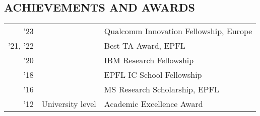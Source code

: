 \documentclass[margin, 10pt]{res} %
\begin{document}
\begin{resume}
\section{ACHIEVEMENTS AND AWARDS} 
\begin{tabular}{rll}
'23        &                   & Qualcomm Innovation Fellowship, Europe \\
'21, '22    &                   & Best TA Award, EPFL \\
'20        &                   & IBM Research Fellowship \\
'18        &                   & EPFL IC School Fellowship \\
'16 		& 					& MS Research Scholarship, EPFL \\
'12		&University level 	& Academic Excellence Award  \\
\end{tabular} 




\end{resume}
\end{document}
